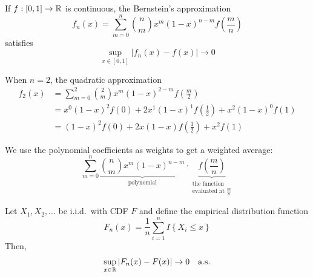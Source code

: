

\begin{theorem}
    If $f: [0,1] \to \mathbb{R}$ is continuous, the Bernstein's approximation
    \[f_n(x) = \sum_{m=0}^n \binom{n}{m}x^m(1-x)^{n-m}f\left(\frac{m}{n}\right)\]
    satisfies
    \[\sup_{x\in[0,1]}|f_n(x) - f(x)| \to 0\]
\end{theorem}

\begin{example}
    When $n = 2$, the quadratic approximation
    \begin{align*}
        f_2(x) &= \sum_{m=0}^2 \binom{2}{m}x^m(1-x)^{2-m}f\left(\frac{m}{2}\right)\\
        &= x^0(1-x)^2f(0) + 2x^1(1-x)^1f\left(\frac12\right) + x^2(1-x)^0f(1)\\
        &= (1-x)^2f(0) + 2x(1-x)f\left(\frac12\right) + x^2f(1)
    \end{align*}
\end{example}

\begin{center}
\end{center}
We use the polynomial coefficients as weights to get a weighted average:
\[\sum_{m=0}^n \underbrace{\binom{n}{m}x^m(1-x)^{n-m}}_{\text{polynomial}}\cdot\underbrace{f\left(\frac{m}{n}\right)}_{\substack{\text{the function}\\ \text{evaluated at } \frac{m}{n}}}\]

\begin{theorem}
    Let $X_1, X_2, \dots$ be i.i.d.\ with CDF $F$ and define the empirical distribution function
    \[F_n(x) = \frac{1}{n}\sum_{i=1}^n I\left\{X_i \leq x\right\}\]
    Then,
    \[\sup_{x\in\mathbb{R}}|F_n(x) - F(x)| \to 0 \quad \text{a.s.}\]
\end{theorem}

